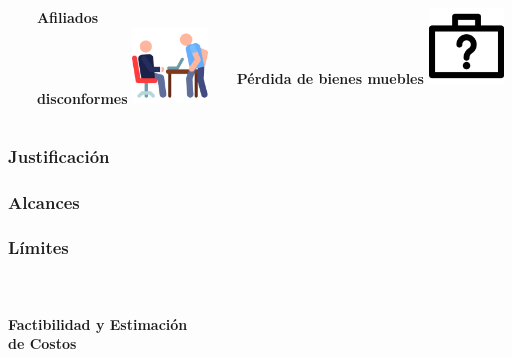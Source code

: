 \documentclass[xcolor=dvipsnames]{beamer}
\begin{document}
\begin{frame}
\begin{columns}
\begin{column}{0.3\textwidth}
      \end{column}
      \begin{column}{0.3\textwidth}
        \centering\textbf{\textcolor{color3}{\small Afiliados\\disconformes}\vspace{3mm}}
        \vspace{10mm}
        \includegraphics[width=20mm]{032-anger}
      \end{column}
      \begin{column}{0.3\textwidth}
        \centering\textbf{\textcolor{color3}{\small Pérdida de bienes muebles}\vspace{3mm}}
        \vspace{10mm}
        \includegraphics[width=20mm]{029-lost-items}
      \end{column}      
    \end{columns}
\end{frame}

\begin{frame}
    \frametitle{Justificación}
\end{frame}

\begin{frame}
    \frametitle{Alcances}
\end{frame}

\begin{frame}
    \frametitle{Límites}
\end{frame}

\begin{frame}
    \centering\color{color3}{\rule{10cm}{5pt}}\\
    \vspace{-3mm}
    \centering\color{color3}{\rule{10cm}{1.5pt}}\\
    \vspace{2mm}
    \centering\textbf{\huge{\textcolor{color1}{Factibilidad y Estimación\\ de Costos}}}\\
    \centering\color{color3}{\rule{10cm}{1.5pt}}\\
\end{frame}
\end{document}

